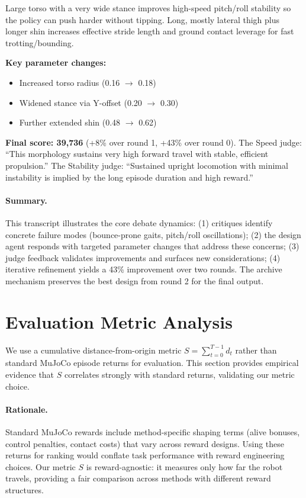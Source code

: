 \begin{promptbox}
Large torso with a very wide stance improves high-speed pitch/roll stability so the policy can push harder without tipping. Long, mostly lateral thigh plus longer shin increases effective stride length and ground contact leverage for fast trotting/bounding.
\end{promptbox}

\noindent\textbf{Key parameter changes:}
\begin{itemize}[nosep,leftmargin=*]
    \item Increased torso radius (0.16 $\to$ 0.18)
    \item Widened stance via Y-offset (0.20 $\to$ 0.30)
    \item Further extended shin (0.48 $\to$ 0.62)
\end{itemize}

\noindent\textbf{Final score: 39,736} (+8\% over round 1, +43\% over round 0). The Speed judge: ``This morphology sustains very high forward travel with stable, efficient propulsion.'' The Stability judge: ``Sustained upright locomotion with minimal instability is implied by the long episode duration and high reward.''

\paragraph{Summary.}
This transcript illustrates the core debate dynamics: (1) critiques identify concrete failure modes (bounce-prone gaits, pitch/roll oscillations); (2) the design agent responds with targeted parameter changes that address these concerns; (3) judge feedback validates improvements and surfaces new considerations; (4) iterative refinement yields a 43\% improvement over two rounds. The archive mechanism preserves the best design from round 2 for the final output.

\section{Evaluation Metric Analysis}
\label{app:metric-correlation}

We use a cumulative distance-from-origin metric $S = \sum_{t=0}^{T-1} d_t$ rather than standard MuJoCo episode returns for evaluation. This section provides empirical evidence that $S$ correlates strongly with standard returns, validating our metric choice.

\paragraph{Rationale.}
Standard MuJoCo rewards include method-specific shaping terms (alive bonuses, control penalties, contact costs) that vary across reward designs. Using these returns for ranking would conflate task performance with reward engineering choices. Our metric $S$ is reward-agnostic: it measures only how far the robot travels, providing a fair comparison across methods with different reward structures.

